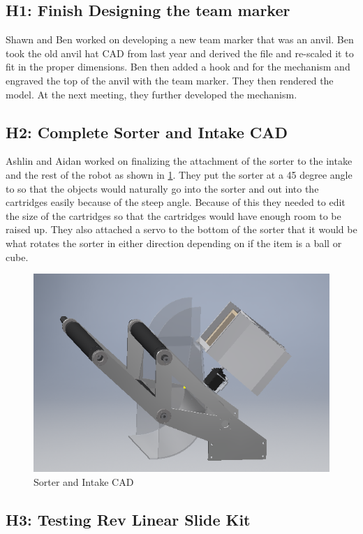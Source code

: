 \documentclass{article}
\begin{document}
\subsection{H1: Finish Designing the team marker}

Shawn and Ben worked on developing a new team marker that was an anvil. Ben took the old anvil hat CAD from last year and derived the file and re-scaled it to fit in the proper dimensions. Ben then added a hook and for the mechanism and engraved the top of the anvil with the team marker. They then rendered the model. At the next meeting, they further developed the mechanism.

\subsection{H2: Complete Sorter and Intake CAD}

Ashlin and Aidan worked on finalizing the attachment of the sorter to the intake and the rest of the robot as shown in \ref{fig:Intake CAD}. They put the sorter at a 45 degree angle to so that the objects would naturally go into the sorter and out into the cartridges easily because of the steep angle. Because of this they needed to edit the size of the cartridges so that the cartridges would have enough room to be raised up. They also attached a servo to the bottom of the sorter that it would be what rotates the sorter in either direction depending on if the item is a ball or cube.

\begin{figure}
    \centering
    \includegraphics[width=.6 \textwidth]{07_10-15/images/IntakeCAD.png}
    \caption{Sorter and Intake CAD}
    \label{fig:Intake CAD}
\end{figure}

\subsection{H3: Testing Rev Linear Slide Kit}
\end{document}
